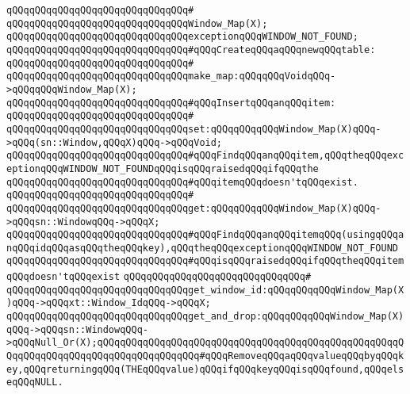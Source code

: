 \verb|qQQqqQQqqQQqqQQqqQQqqQQqqQQqqQQq#|\newline
\verb|qQQqqQQqqQQqqQQqqQQqqQQqqQQqqQQqWindow_Map(X);|\newline
\newline
\verb|qQQqqQQqqQQqqQQqqQQqqQQqqQQqqQQqexceptionqQQqWINDOW_NOT_FOUND;|\newline
\newline
\verb|qQQqqQQqqQQqqQQqqQQqqQQqqQQqqQQq#qQQqCreateqQQqaqQQqnewqQQqtable:|\newline
\verb|qQQqqQQqqQQqqQQqqQQqqQQqqQQqqQQq#|\newline
\verb|qQQqqQQqqQQqqQQqqQQqqQQqqQQqqQQqmake_map:qQQqqQQqVoidqQQq->qQQqqQQqWindow_Map(X);|\newline
\newline
\verb|qQQqqQQqqQQqqQQqqQQqqQQqqQQqqQQq#qQQqInsertqQQqanqQQqitem:|\newline
\verb|qQQqqQQqqQQqqQQqqQQqqQQqqQQqqQQq#|\newline
\verb|qQQqqQQqqQQqqQQqqQQqqQQqqQQqqQQqset:qQQqqQQqqQQqWindow_Map(X)qQQq->qQQq(sn::Window,qQQqX)qQQq->qQQqVoid;|\newline
\newline
\verb|qQQqqQQqqQQqqQQqqQQqqQQqqQQqqQQq#qQQqFindqQQqanqQQqitem,qQQqtheqQQqexceptionqQQqWINDOW_NOT_FOUNDqQQqisqQQqraisedqQQqifqQQqthe|\newline
\verb|qQQqqQQqqQQqqQQqqQQqqQQqqQQqqQQq#qQQqitemqQQqdoesn'tqQQqexist.|\newline
\verb|qQQqqQQqqQQqqQQqqQQqqQQqqQQqqQQq#|\newline
\verb|qQQqqQQqqQQqqQQqqQQqqQQqqQQqqQQqget:qQQqqQQqqQQqWindow_Map(X)qQQq->qQQqsn::WindowqQQq->qQQqX;|\newline
\newline
\verb|qQQqqQQqqQQqqQQqqQQqqQQqqQQqqQQq#qQQqFindqQQqanqQQqitemqQQq(usingqQQqanqQQqidqQQqasqQQqtheqQQqkey),qQQqtheqQQqexceptionqQQqWINDOW_NOT_FOUND|\newline
\verb|qQQqqQQqqQQqqQQqqQQqqQQqqQQqqQQq#qQQqisqQQqraisedqQQqifqQQqtheqQQqitemqQQqdoesn'tqQQqexist|\newline
\verb|qQQqqQQqqQQqqQQqqQQqqQQqqQQqqQQq#|\newline
\verb|qQQqqQQqqQQqqQQqqQQqqQQqqQQqqQQqget_window_id:qQQqqQQqqQQqWindow_Map(X)qQQq->qQQqxt::Window_IdqQQq->qQQqX;|\newline
\newline
\verb|qQQqqQQqqQQqqQQqqQQqqQQqqQQqqQQqget_and_drop:qQQqqQQqqQQqWindow_Map(X)qQQq->qQQqsn::WindowqQQq->qQQqNull_Or(X);qQQqqQQqqQQqqQQqqQQqqQQqqQQqqQQqqQQqqQQqqQQqqQQqqQQqqQQqqQQqqQQqqQQqqQQqqQQqqQQqqQQqqQQq#qQQqRemoveqQQqaqQQqvalueqQQqbyqQQqkey,qQQqreturningqQQq(THEqQQqvalue)qQQqifqQQqkeyqQQqisqQQqfound,qQQqelseqQQqNULL.|\newline
